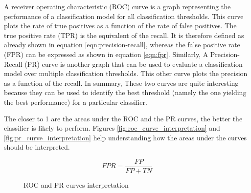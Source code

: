 \documentclass[LaM,binding=0.6cm, english]{sapthesis}
\begin{document}
A receiver operating characteristic (ROC) curve is a graph representing the performance of a classification model for all classification thresholds. This curve plots the rate of true positives as a function of the rate of false positives. The true positive rate (TPR) is the equivalent of the recall. It is therefore defined as already shown in equation \ref{eqn:precision-recall}, whereas the false positive rate (FPR) can be expressed as shown in equation \ref{eqn:fpr}. Similarly, A Precision-Recall (PR) curve is another graph that can be used to evaluate a classification model over multiple classification thresholds. This other curve plots the precision as a function of the recall. In summary, These two curves are quite interesting because they can be used to identify the best threshold (namely the one yielding the best performance) for a particular classifier.

The closer to 1 are the areas under the ROC and the PR curves, the better the classifier is likely to perform. Figures \ref{fig:roc_curve_interpretation} and \ref{fig:pr_curve_interpretation} help understanding how the areas under the curves should be interpreted.

\begin{equation}
\label{eqn:fpr}
FPR = \frac{FP}{FP + TN}
\end{equation}

\begin{figure}[!ht]
  \centering
  \hfill
  \caption{ROC and PR curves interpretation}
\end{figure}
\end{document}
